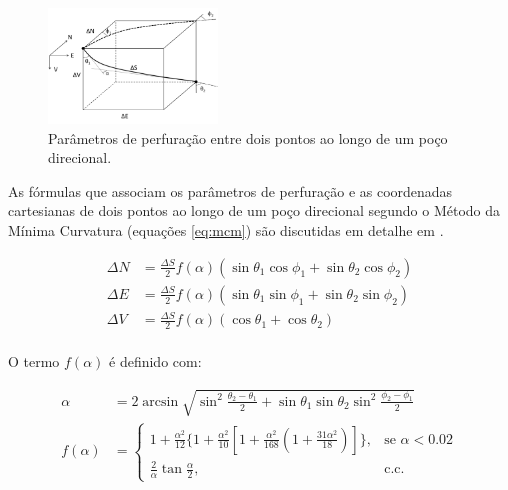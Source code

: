 \documentclass[final,5p]{elsarticle}
\numberwithin{equation}{section}
\begin{document}
\begin{figure}[ht]
    \centering
    \includegraphics[width=0.4\textwidth]{Parametros}
    \caption{Parâmetros de perfuração entre dois pontos ao longo de um poço direcional.}
    \label{fig:parametros}
\end{figure}


As fórmulas que associam os parâmetros de perfuração e as coordenadas cartesianas de dois pontos ao longo de um poço direcional segundo o Método da Mínima Curvatura (equações \ref{eq:mcm}) são discutidas em detalhe em \cite{10.2118/84246-MS}.

\begin{subequations}\label{eq:mcm}
    \begin{align} 
        \Delta N &= \frac{\Delta S}{2} f(\alpha) (\sin \theta_1 \cos \phi_1 + \sin \theta_2 \cos \phi_2)\label{eq:deltaN}\\
        \Delta E &= \frac{\Delta S}{2} f(\alpha) (\sin \theta_1 \sin \phi_1 + \sin \theta_2 \sin \phi_2)\label{eq:deltaE}\\
        \Delta V &= \frac{\Delta S}{2} f(\alpha) (\cos \theta_1 + \cos \theta_2)\label{eq:deltaV}\\
    \end{align}
\end{subequations}

O termo $f(\alpha)$ é definido com:

\begin{subequations}\label{eq:falfa}
    \begin{align} 
        \alpha &= 2 \arcsin \sqrt{ \sin^2 \frac{\theta_2-\theta_1}{2} + \sin \theta_1 \sin \theta_2 \sin^2 \frac{\phi_2-\phi_1}{2}}\label{eq:alpha}\\
        f(\alpha) &= \begin{cases}
                1+\frac{\alpha^2}{12}\{1+\frac{\alpha^2}{10}[1+\frac{\alpha^2}{168}(1+\frac{31\alpha^2}{18})]\},&\text{se } \alpha<0.02 \\
                \frac{2}{\alpha}\tan{\frac{\alpha}{2}},&\text{c.c. }  
            \end{cases}\label{eq:f_alpha}
    \end{align}
\end{subequations}
\end{document}
